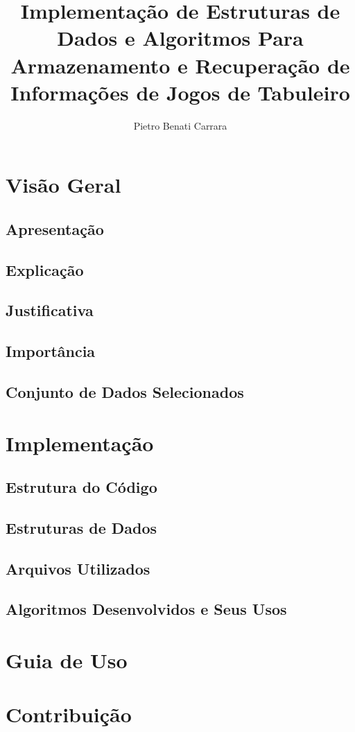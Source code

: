\documentclass[twocolumn]{article}
\author{Pietro Benati Carrara}
\title{Implementação de Estruturas de Dados e Algoritmos Para Armazenamento e Recuperação de Informações de Jogos de Tabuleiro}
\begin{document}
\maketitle

\section{Visão Geral}

\subsection{Apresentação}

\subsection{Explicação}

\subsection{Justificativa}

\subsection{Importância}

\subsection{Conjunto de Dados Selecionados}

\section{Implementação}

\subsection{Estrutura do Código}

\subsection{Estruturas de Dados}

\subsection{Arquivos Utilizados}

\subsection{Algoritmos Desenvolvidos e Seus Usos}

\section{Guia de Uso}

\section{Contribuição}
\end{document}
